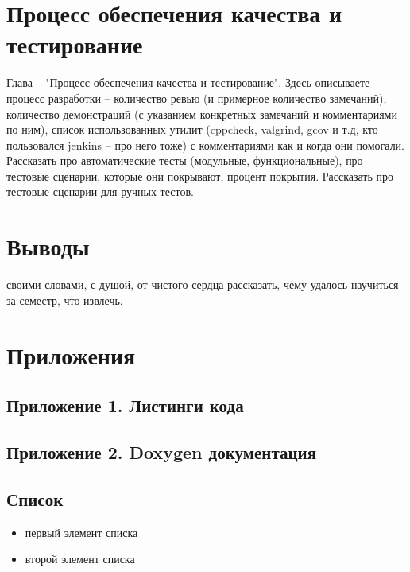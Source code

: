 \section*{Процесс обеспечения качества и тестирование}

Глава -- "Процесс обеспечения качества и тестирование". Здесь описываете процесс разработки -- количество ревью (и примерное количество замечаний), количество демонстраций (с указанием конкретных замечаний и комментариями по ним), список использованных утилит (cppcheck, valgrind, gcov и т.д, кто пользовался jenkins -- про него тоже) с комментариями как и когда они помогали. Рассказать про автоматические тесты (модульные, функциональные), про тестовые сценарии, которые они покрывают, процент покрытия. Рассказать про тестовые сценарии для ручных тестов.


\section*{Выводы}

своими словами, с душой, от чистого сердца рассказать, чему удалось научиться за семестр, что извлечь.


\section*{Приложения}

\subsection*{Приложение 1. Листинги кода}


\subsection*{Приложение 2. Doxygen документация}

\subsection*{Список}

\begin{itemize}
\item первый элемент списка
\item второй элемент списка
\end{itemize}


